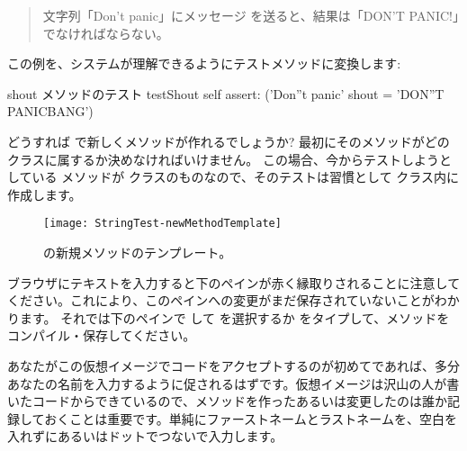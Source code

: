 \documentclass[a4paper,10pt,twoside]{book}
\begin{document}
\begin{quote}
文字列「Don't panic」にメッセージ  を送ると、結果は「DON'T PANIC!」でなければならない。
\end{quote}

\noindent
この例を、システムが理解できるようにテストメソッドに変換します:

\begin{method}[testShout]{shout メソッドのテスト}
testShout
	self assert: ('Don''t panic' shout = 'DON''T PANICBANG')
\end{method} %

どうすれば \pharo で新しくメソッドが作れるでしょうか? 最初にそのメソッドがどのクラスに属するか決めなければいけません。
この場合、今からテストしようとしている  メソッドが  クラスのものなので、そのテストは習慣として  クラス内に作成します。

\begin{figure}[hbt]
\centerline {\texttt{[image: StringTest-newMethodTemplate]}}
\caption{ の新規メソッドのテンプレート。
}
\end{figure}

ブラウザにテキストを入力すると下のペインが赤く縁取りされることに注意してください。これにより、このペインへの変更がまだ保存されていないことがわかります。
それでは下のペインで \actclick して  を選択するか  をタイプして、メソッドをコンパイル・保存してください。

あなたがこの仮想イメージでコードをアクセプトするのが初めてであれば、多分あなたの名前を入力するように促されるはずです。仮想イメージは沢山の人が書いたコードからできているので、メソッドを作ったあるいは変更したのは誰か記録しておくことは重要です。単純にファーストネームとラストネームを、空白を入れずにあるいはドットでつないで入力します。

\end{document}
